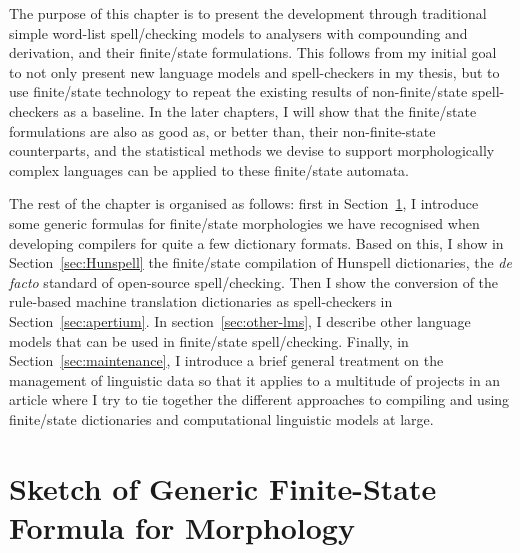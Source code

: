 \documentclass[officiallayout,final]{unihelcompling}
\begin{document}
The purpose of this chapter is to present the development through traditional
simple word-list spell\-/checking models to  analysers with compounding and derivation,
and their finite\-/state formulations.  This follows from my initial goal to
not only present new language models and spell-checkers in my thesis, but to
use finite\-/state technology to repeat the existing results of
non-finite\-/state spell-checkers as a baseline. In the later chapters, I will
show that the finite\-/state formulations are also as good as, or better than,
their non-finite-state counterparts, and the statistical methods we devise to
support morphologically complex languages can be applied to these
finite\-/state automata.

The rest of the chapter is organised as follows: first in
Section~\ref{sec:generic}, I introduce some generic formulas for finite\-/state
morphologies we have recognised when developing compilers for quite a few
dictionary formats. Based on this, I show in Section~\ref{sec:Hunspell} the
finite\-/state compilation of Hunspell dictionaries, the \emph{de facto}
standard of open-source spell\-/checking.  Then I show the conversion of the
rule-based machine translation dictionaries as spell-checkers in
Section~\ref{sec:apertium}. In section~\ref{sec:other-lms}, I describe other
language models that can be used in finite\-/state spell\-/checking. Finally,
in Section~\ref{sec:maintenance}, I introduce a brief general treatment on the
management of linguistic data so that it applies to a multitude of projects in
an article where I try to tie together the different approaches to compiling
and using finite\-/state dictionaries and computational linguistic models
at large.

\section{Sketch of Generic Finite-State Formula for Morphology}
\label{sec:generic}
\end{document}
